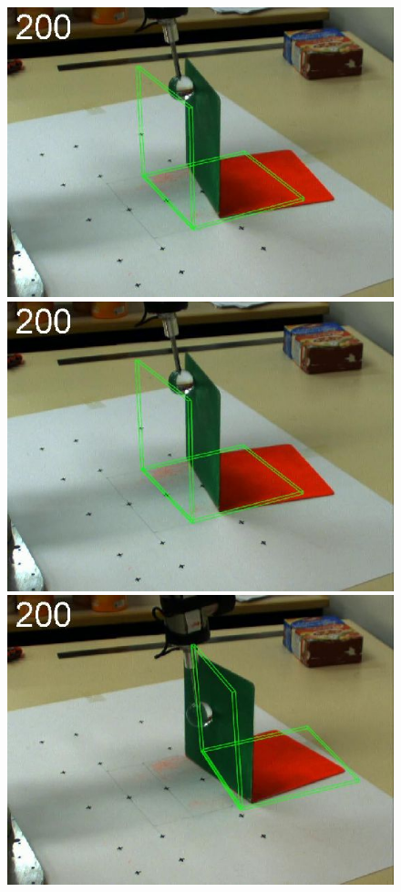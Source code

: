 \begin{figure}[tb]
{\includegraphics[width=\imgBXwid]{./B2_1exp_58_3}
\includegraphics[width=\imgBXwid]{./B2_LWPR1_58_3}
\includegraphics[width=\imgBXwid]{./B2_2exp_38_3}
}


\end{figure}
